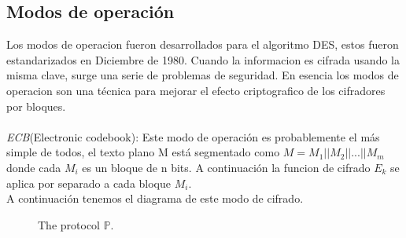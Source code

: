 \documentclass[12pt,oneside,onecolumn,openany]{report}
\begin{document}
\subsection{Modos de operación}
Los modos de operacion fueron desarrollados para el algoritmo DES, estos fueron estandarizados en Diciembre de 1980. 
Cuando la informacion es cifrada usando la misma clave, surge una serie de problemas de seguridad. En esencia los modos de operacion son una técnica para mejorar el efecto criptografico de los cifradores por bloques.\cite{modes}\\\\
\textit{ECB}(Electronic codebook): Este modo de operación es probablemente el más simple de todos, el texto plano M está segmentado como $ M=M_1||M_2||...||M_m$ donde cada $M_i$ es un bloque de n bits. A continuación la funcion de cifrado $E_k$ se aplica por separado a cada bloque $M_i$. \\
A continuación tenemos el diagrama de este modo de cifrado.\\

\begin{figure}
\centering
{}
\hspace*{0.5cm}
\caption{\label{fig:protocol} The protocol ${\mathbb P}$.}
\end{figure}


\end{document}
